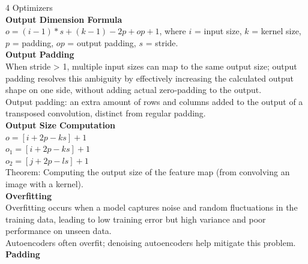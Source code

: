 \documentclass[8pt]{extarticle}
\begin{document}
\begin{multicols}{4}
Optimizers\\
\vspace{2pt}\textbf{Output Dimension Formula}\\
$o = (i - 1) * s + (k - 1) - 2p + op + 1$, where $i$ = input size, $k$ = kernel size, $p$ = padding, $op$ = output padding, $s$ = stride.\\
\vspace{2pt}\textbf{Output Padding}\\
When stride > 1, multiple input sizes can map to the same output size; output padding resolves this ambiguity by effectively increasing the calculated output shape on one side, without adding actual zero‑padding to the output.\\
Output padding: an extra amount of rows and columns added to the output of a transposed convolution, distinct from regular padding.\\
\vspace{2pt}\textbf{Output Size Computation}\\
$o = [i + 2p - k s ] + 1$\\
$o_{1} = [i + 2p - k s ] + 1$\\
$o_{2} = [j + 2p - l s ] + 1$\\
Theorem: Computing the output size of the feature map (from convolving an image with a kernel).\\
\vspace{2pt}\textbf{Overfitting}\\
Overfitting occurs when a model captures noise and random fluctuations in the training data, leading to low training error but high variance and poor performance on unseen data.\\
Autoencoders often overfit; denoising autoencoders help mitigate this problem.\\
\vspace{2pt}\textbf{Padding}\\


\end{multicols}
\end{document}
